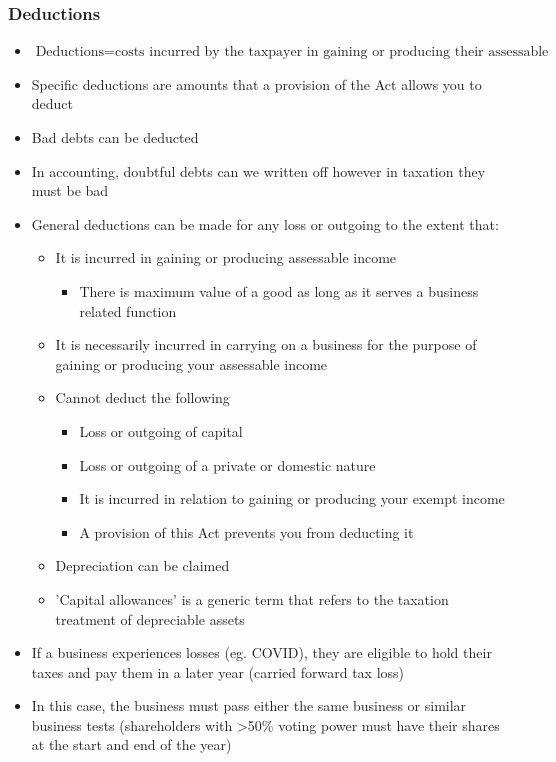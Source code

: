 \documentclass{article}
\begin{document}
		\subsubsection{Deductions}
			\begin{itemize}
				\item $\text{Deductions} = \text{costs incurred by the taxpayer in gaining or producing their assessable income}$
				\item Specific deductions are amounts that a provision of the Act allows you to deduct
				\item Bad debts can be deducted
				\item In accounting, doubtful debts can we written off however in taxation they must be bad
				\item General deductions can be made for any loss or outgoing to the extent that:
					\begin{itemize}
						\item It is incurred in gaining or producing assessable income
							\begin{itemize}
								\item There is maximum value of a good as long as it serves a business related function
							\end{itemize}
						\item It is necessarily incurred in carrying on a business for the purpose of gaining or producing your assessable income
						\item Cannot deduct the following
							\begin{itemize}
								\item Loss or outgoing of capital
								\item Loss or outgoing of a private or domestic nature
								\item It is incurred in relation to gaining or producing your exempt income
								\item A provision of this Act prevents you from deducting it
							\end{itemize}
						\item Depreciation can be claimed
						\item 'Capital allowances' is a generic term that refers to the taxation treatment of depreciable assets
					\end{itemize}
			\end{itemize}

	\begin{itemize}
		\item If a business experiences losses (eg. COVID), they are eligible to hold their taxes and pay them in a later year (carried forward tax loss)
		\item In this case, the business must pass either the same business or similar business tests (shareholders with >50\% voting power must have their shares at the start and end of the year)
	\end{itemize}
\end{document}
